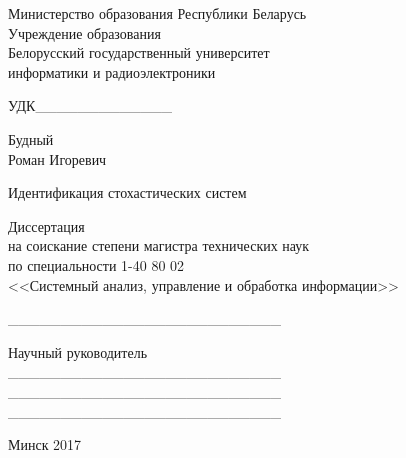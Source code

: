 \thispagestyle{empty}
\setlength{\parindent}{0mm} %

\begin{center}
  Министерство образования Республики Беларусь \\
  \smallskip
  Учреждение образования \\
  Белорусский государственный университет \\
  информатики и радиоэлектроники \\
\end{center}

\vspace{2\baselineskip}
УДК\_\_\_\_\_\_\_\_\_\_\_\_\_

\vspace{4\baselineskip}
\begin{center}
  Будный \\ Роман Игоревич

  \vspace{3\baselineskip}
  Идентификация стохастических систем

  \bigskip
  Диссертация \\
  на соискание степени магистра технических наук \\
  по специальности 1-40 80 02 \\
  <<Системный анализ, управление и обработка информации>>
\end{center}

\vspace{2\baselineskip}
\begin{minipage}{.45\linewidth}
\end{minipage}
\hfill
\begin{minipage}{.45\linewidth}
  \_\_\_\_\_\_\_\_\_\_\_\_\_\_\_\_\_\_\_\_\_\_\_\_\_\_

  \bigskip
  Научный руководитель \\
  \_\_\_\_\_\_\_\_\_\_\_\_\_\_\_\_\_\_\_\_\_\_\_\_\_\_ \\
  \_\_\_\_\_\_\_\_\_\_\_\_\_\_\_\_\_\_\_\_\_\_\_\_\_\_ \\
  \_\_\_\_\_\_\_\_\_\_\_\_\_\_\_\_\_\_\_\_\_\_\_\_\_\_
\end{minipage}

\vfill
\begin{center}
  Минск 2017
\end{center}

\setlength{\parindent}{1.25cm} %
\newpage